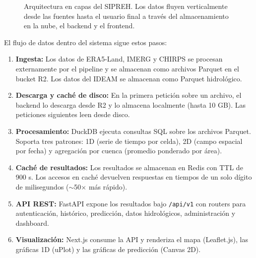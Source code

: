 \begin{figure}[H]
\caption{Arquitectura en capas del SIPREH. Los datos fluyen verticalmente desde las
fuentes hasta el usuario final a través del almacenamiento en la nube, el backend y
el frontend.}
\label{fig:arquitectura_sipreh}
\end{figure}

El flujo de datos dentro del sistema sigue estos pasos:

\begin{enumerate}
    \item \textbf{Ingesta:} Los datos de ERA5-Land, IMERG y CHIRPS se procesan externamente por el pipeline y se almacenan como archivos Parquet en el bucket R2. Los datos del IDEAM se almacenan como Parquet hidrológico.

    \item \textbf{Descarga y caché de disco:} En la primera petición sobre un archivo, el backend lo descarga desde R2 y lo almacena localmente (hasta 10 GB). Las peticiones siguientes leen desde disco.

    \item \textbf{Procesamiento:} DuckDB ejecuta consultas SQL sobre los archivos Parquet. Soporta tres patrones: 1D (serie de tiempo por celda), 2D (campo espacial por fecha) y agregación por cuenca (promedio ponderado por área).

    \item \textbf{Caché de resultados:} Los resultados se almacenan en Redis con TTL de 900 s. Los accesos en caché devuelven respuestas en tiempos de un solo dígito de milisegundos ($\sim$50$\times$ más rápido).

    \item \textbf{API REST:} FastAPI expone los resultados bajo \texttt{/api/v1} con routers para autenticación, histórico, predicción, datos hidrológicos, administración y dashboard.

    \item \textbf{Visualización:} Next.js consume la API y renderiza el mapa (Leaflet.js), las gráficas 1D (uPlot) y las gráficas de predicción (Canvas 2D).
\end{enumerate}

